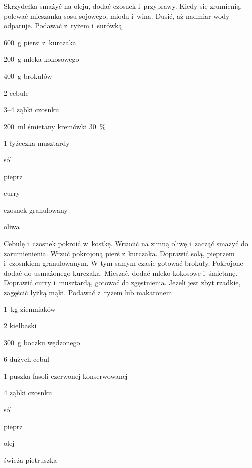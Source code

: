 \documentclass[../kucharek.tex]{subfiles}
\begin{document}
Skrzydełka smażyć na oleju, dodać czosnek i~przyprawy. Kiedy się zrumienią,
polewać mieszanką sosu sojowego, miodu i~wina. Dusić, aż nadmiar wody odparuje.
Podawać z~ryżem i~surówką.


\begin{Ingred}
    \item \qty{600}{\gram} piersi z~kurczaka
    \item \qty{200}{\gram} mleka kokosowego
    \item \qty{400}{\gram} brokułów
    \item \num{2} cebule
    \item \numrange{3}{4} ząbki czosnku
    \item \qty{200}{\milli\litre} śmietany kremówki \qty{30}{\percent}
    \item \num{1} łyżeczka musztardy
    \item sól
    \item pieprz
    \item curry
    \item czosnek granulowany
    \item oliwa
\end{Ingred}

Cebulę i~czosnek pokroić w~kostkę. Wrzucić na zimną oliwę i~zacząć smażyć do
zarumienienia. Wrzuć pokrojoną pierś z~kurczaka. Doprawić solą, pieprzem
i~czosnkiem granulowanym. W tym samym czasie gotować brokuły. Pokrojone dodać
do usmażonego kurczaka. Mieszać, dodać mleko kokosowe i~śmietanę. Doprawić
curry i~musztardą, gotować do zgęstnienia. Jeżeli jest zbyt rzadkie, zagęścić
łyżką mąki. Podawać z~ryżem lub makaronem.


\begin{Ingred}
    \item \qty{1}{\kilo\gram} ziemniaków
    \item \num{2} kiełbaski
    \item \qty{300}{\gram} boczku wędzonego
    \item \num{6} dużych cebul
    \item \num{1} puszka fasoli czerwonej konserwowanej
    \item \num{4} ząbki czosnku
    \item sól
    \item pieprz
    \item olej
    \item świeża pietruszka
\end{Ingred}
\end{document}
